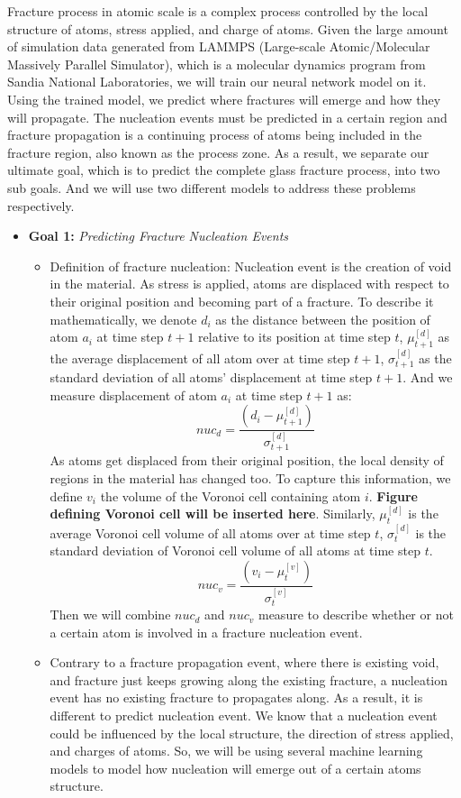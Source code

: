 
Fracture process in atomic scale is a complex process controlled by the local structure of atoms, stress applied, and charge of atoms. 
Given the large amount of simulation data generated from LAMMPS (Large-scale Atomic/Molecular Massively Parallel Simulator), which is a molecular dynamics program from Sandia National Laboratories, we will train our neural network model on it. Using the trained model, we predict where fractures will emerge and how they will propagate. The nucleation events must be predicted in a certain region and fracture propagation is a continuing process of atoms being included in the fracture region, also known as the process zone. As a result, we separate our ultimate goal, which is to predict the complete glass fracture process, into two sub goals. And we will use two different models to address these problems respectively. 


\begin{itemize}
\item \textbf{Goal 1:} \emph{Predicting Fracture Nucleation Events} 
\begin{itemize} 
    \item Definition of fracture nucleation: Nucleation event is the creation of void in the material. As stress is applied, atoms are displaced with respect to their original position and becoming part of a fracture. To describe it mathematically, we denote $d_i$ as the distance between the position of atom $a_i$ at time step $t+1$ relative to its position at time step $t$, $\mu^{[d]}_{t+1}$ as the average displacement of all atom over at time step $t+1$, $\sigma^{[d]}_{t+1}$ as the standard deviation of all atoms' displacement at time step $t+1$. And we measure displacement of atom $a_i$ at time step $t+1$ as:
    \[
    nuc_d = \frac{(d_i - \mu^{[d]}_{t+1})}{\sigma^{[d]}_{t+1}}
    \]
    As atoms get displaced from their original position, the local density of regions in the material has changed too. To capture this information, we define $v_i$ the volume of the Voronoi cell containing atom $i$. \textbf{Figure defining Voronoi cell will be inserted here}. Similarly, $\mu^{[d]}_{t}$ is the average Voronoi cell volume of all atoms over at time step $t$, $\sigma^{[d]}_{t}$ is the standard deviation of Voronoi cell volume of all atoms at time step $t$. 
    \[
    nuc_v = \frac{(v_i - \mu^{[v]}_{t})}{\sigma^{[v]}_{t}}
    \]
    Then we will combine $nuc_d$ and $nuc_v$ measure to describe whether or not a certain atom is involved in a fracture nucleation event. 
    \item Contrary to a fracture propagation event, where there is existing void, and fracture just keeps growing along the existing fracture, a nucleation event has no existing fracture to propagates along. As a result, it is different to predict nucleation event. We know that a nucleation event could be influenced by the local structure, the direction of stress applied, and charges of atoms. So, we will be using several machine learning models to model how nucleation will emerge out of a certain atoms structure. 
\end{itemize}
\end{itemize}


